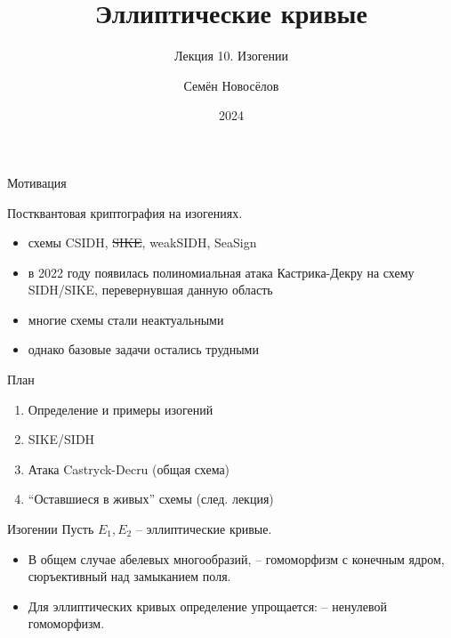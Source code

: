 \documentclass{beamer}
\title{Эллиптические кривые}
\subtitle{Лекция 10. Изогении}
\author{Семён Новосёлов}
\institute{БФУ им. И. Канта}
\date{2024}
\begin{document}
\frame{\titlepage}

\newcommand{\UserA}{{\structure{{\Large\faUserSecret}}}}
\newcommand{\UserB}{{\structure{{\Large\faCat}}}}

\begin{frame}{Мотивация}
	
Постквантовая криптография на изогениях.
\vspace{0.5em}
	
\begin{itemize}
	\item схемы CSIDH, \sout{SIKE}, weakSIDH, SeaSign
	\item в 2022 году появилась полиномиальная атака Кастрика-Декру на схему SIDH/SIKE, перевернувшая данную область
	\item многие схемы стали неактуальными
	\item однако базовые задачи остались трудными
\end{itemize}
\end{frame}

\begin{frame}{План}
\begin{enumerate}
	\item Определение и примеры изогений
	\item SIKE/SIDH
	\item Атака Castryck-Decru (общая схема)
	\item ``Оставшиеся в живых'' схемы (след. лекция)
\end{enumerate}
\end{frame}

\begin{frame}{Изогении}
Пусть $E_1, E_2$ -- эллиптические кривые.

\begin{itemize}
    \item В общем случае абелевых многообразий,  -- гомоморфизм с конечным ядром, сюръективный над замыканием поля.
    \item Для эллиптических кривых определение упрощается:  -- ненулевой гомоморфизм.
\end{itemize}
\end{frame}
\end{document}
